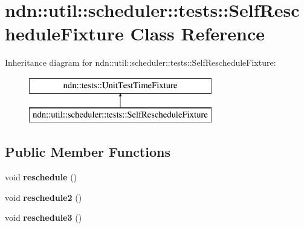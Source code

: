 \hypertarget{classndn_1_1util_1_1scheduler_1_1tests_1_1SelfRescheduleFixture}{}\section{ndn\+:\+:util\+:\+:scheduler\+:\+:tests\+:\+:Self\+Reschedule\+Fixture Class Reference}
\label{classndn_1_1util_1_1scheduler_1_1tests_1_1SelfRescheduleFixture}
Inheritance diagram for ndn\+:\+:util\+:\+:scheduler\+:\+:tests\+:\+:Self\+Reschedule\+Fixture\+:\begin{figure}[H]
\begin{center}
\leavevmode
\includegraphics[height=2.000000cm]{classndn_1_1util_1_1scheduler_1_1tests_1_1SelfRescheduleFixture}
\end{center}
\end{figure}
\subsection*{Public Member Functions}
\begin{DoxyCompactItemize}
\item 
void {\bfseries reschedule} ()\hypertarget{classndn_1_1util_1_1scheduler_1_1tests_1_1SelfRescheduleFixture_ae499b315eeb21d5a30e6bc70066e76d8}{}\label{classndn_1_1util_1_1scheduler_1_1tests_1_1SelfRescheduleFixture_ae499b315eeb21d5a30e6bc70066e76d8}

\item 
void {\bfseries reschedule2} ()\hypertarget{classndn_1_1util_1_1scheduler_1_1tests_1_1SelfRescheduleFixture_a3fc5ff06465e2321029aef649a866277}{}\label{classndn_1_1util_1_1scheduler_1_1tests_1_1SelfRescheduleFixture_a3fc5ff06465e2321029aef649a866277}

\item 
void {\bfseries reschedule3} ()\hypertarget{classndn_1_1util_1_1scheduler_1_1tests_1_1SelfRescheduleFixture_a2d0e5613acc3622df09ec8f7d0f63f31}{}\label{classndn_1_1util_1_1scheduler_1_1tests_1_1SelfRescheduleFixture_a2d0e5613acc3622df09ec8f7d0f63f31}

\end{DoxyCompactItemize}

